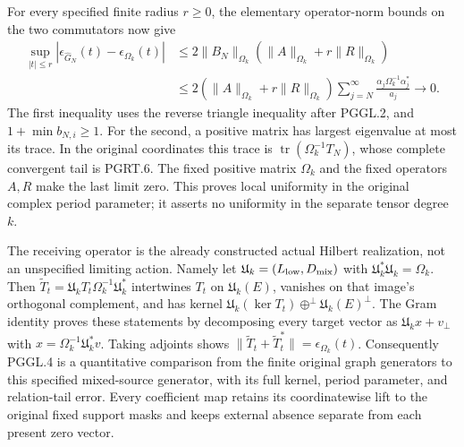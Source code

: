 For every specified finite radius $r\geq0$, the elementary
operator-norm bounds on the two commutators now give
\[
\begin{aligned}
 \sup_{|t|\leq r}|\epsilon_{\widehat G_N}(t)-\epsilon_{\Omega_k}(t)|
 &\leq 2\|B_N\|_{\Omega_k}
                 (\|A\|_{\Omega_k}+r\|R\|_{\Omega_k})\\
 &\leq2(\|A\|_{\Omega_k}+r\|R\|_{\Omega_k})
       \sum_{j=N}^{\infty}
                  \frac{\alpha_j\Omega_k^{-1}\alpha_j^*}{a_j}
 \longrightarrow0.
\end{aligned}
\tag{PGGL.4}\label{eq:pggl-uniform-period-limit}
\]
The first inequality uses the reverse triangle inequality after
PGGL.2, and $1+\min b_{N,i}\geq1$. For the second, a positive
matrix has largest eigenvalue at most its trace. In the original
coordinates this trace is
$\operatorname{tr}(\Omega_k^{-1}T_N)$, whose complete convergent
tail is PGRT.6. The fixed positive matrix $\Omega_k$ and the
fixed operators $A,R$ make the last limit zero. This proves
local uniformity in the original complex period parameter; it
asserts no uniformity in the separate tensor degree $k$.

The receiving operator is the already constructed actual Hilbert
realization, not an unspecified limiting action. Namely let
$\mathfrak U_k=(L_{\rm low},D_{\rm mix})$ with
$\mathfrak U_k^*\mathfrak U_k=\Omega_k$. Then
$\widetilde T_t=\mathfrak U_kT_t\Omega_k^{-1}\mathfrak U_k^*$
intertwines $T_t$ on $\mathfrak U_k(E)$, vanishes on that image's
orthogonal complement, and has kernel
$\mathfrak U_k(\ker T_t)\oplus^\perp\mathfrak U_k(E)^\perp$.
The Gram identity proves these statements by decomposing every
target vector as $\mathfrak U_kx+v_\perp$ with
$x=\Omega_k^{-1}\mathfrak U_k^*v$.
Taking adjoints shows
$\|\widetilde T_t+\widetilde T_t^*\|=\epsilon_{\Omega_k}(t)$.
Consequently PGGL.4 is a quantitative comparison from the finite
original graph generators to this specified mixed-source generator,
with its full kernel, period parameter, and relation-tail error.
Every coefficient map retains its coordinatewise lift to the
original fixed support masks and keeps external absence separate
from each present zero vector.
